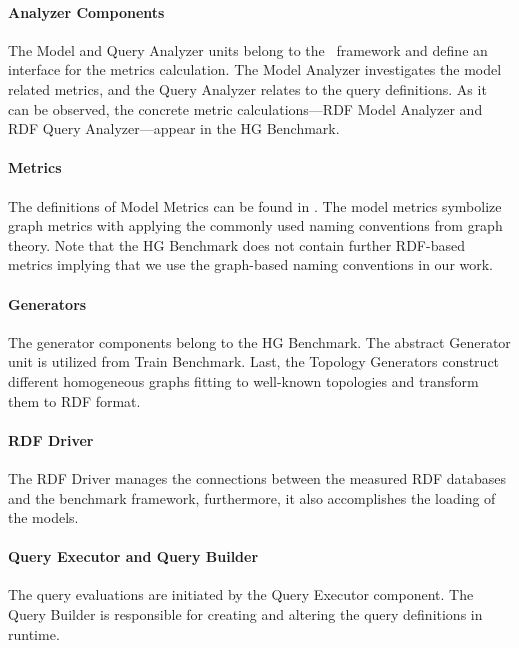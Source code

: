 \paragraph{Analyzer Components}

The \textsf{Model} and \textsf{Query Analyzer} units belong to the \framework~framework and define an interface for the metrics calculation. The \textsf{Model Analyzer} investigates the model related metrics, and the \textsf{Query Analyzer} relates to the query definitions. As it can be observed, the concrete metric calculations---\textsf{RDF Model Analyzer} and \textsf{RDF Query Analyzer}---appear in the HG Benchmark.

\paragraph{Metrics}

The definitions of \textsf{Model Metrics} can be found in \framework. The model metrics symbolize graph metrics with applying the commonly used naming conventions from graph theory. Note that the HG Benchmark does not contain further RDF-based metrics implying that we use the graph-based naming conventions in our work.

\paragraph{Generators}

The generator components belong to the HG Benchmark. The abstract \textsf{Generator} unit is utilized from Train Benchmark. Last, the \textsf{Topology Generators} construct different homogeneous graphs fitting to well-known topologies and transform them to RDF format.

\paragraph{RDF Driver}
The \textsf{RDF Driver} manages the connections between the measured RDF databases and the benchmark framework, furthermore, it also accomplishes the loading of the models. 

\paragraph{Query Executor and Query Builder}

The query evaluations are initiated by the \textsf{Query Executor} component. The \textsf{Query Builder} is responsible for creating and altering the query definitions in runtime.

